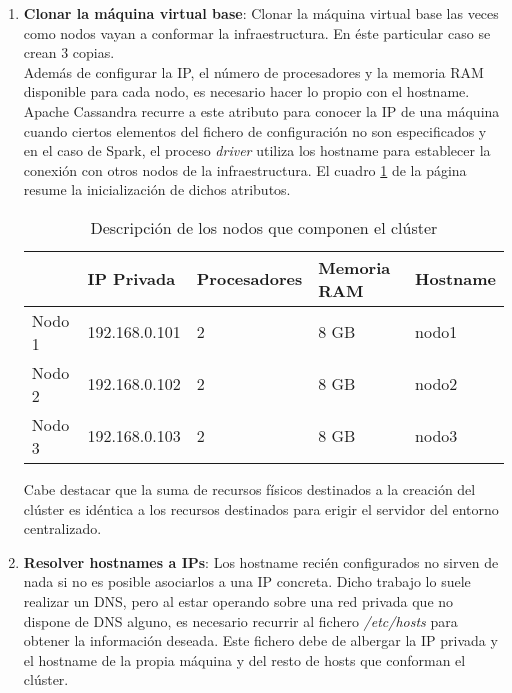\begin{enumerate}
	
\item \textbf{Clonar la máquina virtual base}: Clonar la máquina virtual base las veces como nodos vayan a conformar la infraestructura. En éste particular caso se crean 3 copias.\\

Además de configurar la IP, el número de procesadores y la memoria RAM disponible para cada nodo, es necesario hacer lo propio con el hostname. Apache Cassandra recurre a este atributo para conocer la IP de una máquina cuando ciertos elementos del fichero de configuración no son especificados y en el caso de Spark, el proceso \textit{driver} utiliza los hostname para establecer la conexión con otros nodos de la infraestructura. El cuadro \ref{nodos-cluster} de la página \pageref{nodos-cluster} resume la inicialización de dichos atributos.\\

\begin{table}[h!]
	\centering
	\begin{tabular}{|l||l|l|l|l|}
		
		\hline
		
		& \textbf{IP Privada} & \textbf{Procesadores} & \textbf{Memoria RAM} & \textbf{Hostname} \\
		
		\hline
		\hline
		
		Nodo 1 & 192.168.0.101 & 2 & 8 GB & nodo1 \\
		
		\hline
		
		Nodo 2 & 192.168.0.102 & 2 & 8 GB & nodo2 \\
		
		\hline
		
		Nodo 3 & 192.168.0.103 & 2 & 8 GB & nodo3 \\
		
		\hline
		
	\end{tabular}
	\caption{Descripción de los nodos que componen el clúster}
	\label{nodos-cluster}
\end{table}

Cabe destacar que la suma de recursos físicos destinados a la creación del clúster es idéntica a los recursos destinados para erigir el servidor del entorno centralizado.

\item \textbf{Resolver hostnames a IPs}: Los hostname recién configurados no sirven de nada si no es posible asociarlos a una IP concreta. Dicho trabajo lo suele realizar un DNS, pero al estar operando sobre una red privada que no dispone de DNS alguno, es necesario recurrir al fichero \textit{/etc/hosts} para obtener la información deseada. Este fichero debe de albergar la IP privada y el hostname de la propia máquina y del resto de hosts que conforman el clúster.


\end{enumerate}
